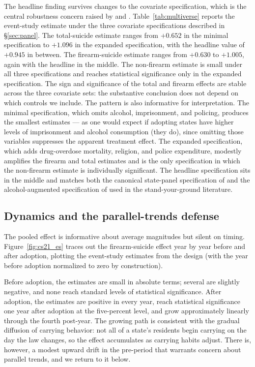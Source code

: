 \documentclass[12pt]{article}
\begin{document}
The headline finding survives changes to the covariate
specification, which is the central robustness concern raised by
\citet{anejadonohuezhang2014} and \citet{donohue2019}.
Table~\ref{tab:multiverse} reports the event-study estimate under
the three covariate specifications described in §\ref{sec:panel}.
The total-suicide estimate ranges from $+0.652$ in the minimal
specification to $+1.096$ in the expanded specification, with the
headline value of $+0.945$ in between. The firearm-suicide estimate
ranges from $+0.630$ to $+1.005$, again with the headline in the
middle. The non-firearm estimate is small under all three
specifications and reaches statistical significance only in the
expanded specification. The sign and significance of the total
and firearm effects are stable across the three covariate sets:
the substantive conclusion does not depend on which controls we
include. The pattern is also informative for interpretation. The
minimal specification, which omits alcohol, imprisonment, and
policing, produces the smallest estimates --- as one would expect
if adopting states have higher levels of imprisonment and alcohol
consumption (they do), since omitting those variables suppresses
the apparent treatment effect. The expanded specification, which
adds drug-overdose mortality, religion, and police expenditure,
modestly amplifies the firearm and total estimates and is the only
specification in which the non-firearm estimate is individually
significant. The headline specification sits in the middle and
matches both the canonical state-panel specification of
\citet{donohue2019} and the alcohol-augmented specification of
\citet{mcclellan2017} used in the stand-your-ground literature.


\subsection{Dynamics and the parallel-trends defense}\label{sec:eventstudy}

The pooled effect is informative about average magnitudes but
silent on timing. Figure~\ref{fig:cs21_es} traces out the
firearm-suicide effect year by year before and after adoption,
plotting the event-study estimates from the
\citet{callaway2021} design (with the year before adoption
normalized to zero by construction).


Before adoption, the estimates are small in absolute terms; several
are slightly negative, and none reach standard levels of statistical
significance. After adoption, the estimates are positive in every
year, reach statistical significance one year after adoption at
the five-percent level, and grow approximately linearly through the
fourth post-year. The growing path is consistent with the gradual
diffusion of carrying behavior: not all of a state's residents
begin carrying on the day the law changes, so the effect
accumulates as carrying habits adjust. There is, however, a modest
upward drift in the pre-period that warrants concern about parallel
trends, and we return to it below.
\end{document}
